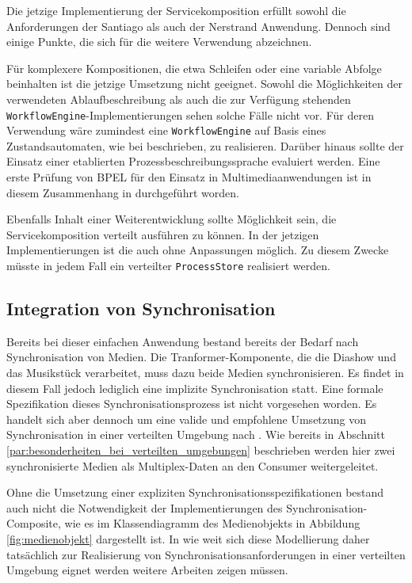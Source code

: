   Die jetzige Implementierung der Servicekomposition erfüllt sowohl die Anforderungen der Santiago als auch der Nerstrand Anwendung. Dennoch sind einige Punkte, die sich für die weitere Verwendung abzeichnen.
  
  Für komplexere Kompositionen, die etwa Schleifen oder eine variable Abfolge beinhalten ist die jetzige Umsetzung nicht geeignet. Sowohl die Möglichkeiten der verwendeten Ablaufbeschreibung als auch die zur Verfügung stehenden \verb!WorkflowEngine!-Implementierungen sehen solche Fälle nicht vor. Für deren Verwendung wäre zumindest eine \verb!WorkflowEngine! auf Basis eines Zustandsautomaten, wie bei \citep{biornstad2006cfs} beschrieben, zu realisieren. Darüber hinaus sollte der Einsatz einer etablierten Prozessbeschreibungssprache evaluiert werden. Eine erste Prüfung von BPEL für den Einsatz in Multimediaanwendungen ist in diesem Zusammenhang in \citep{samma08} durchgeführt worden.

  Ebenfalls Inhalt einer Weiterentwicklung sollte Möglichkeit sein, die Servicekomposition verteilt ausführen zu können. In der jetzigen Implementierungen ist die auch ohne Anpassungen möglich. Zu diesem Zwecke müsste in jedem Fall ein verteilter \verb!ProcessStore! realisiert werden.


\subsection{Integration von Synchronisation} %
\label{sub:integration_von_synchronisation}

  Bereits bei dieser einfachen Anwendung bestand bereits der Bedarf nach Synchronisation von Medien. Die Tranformer-Komponente, die die Diashow und das Musikstück verarbeitet, muss dazu beide Medien synchronisieren. Es findet in diesem Fall jedoch lediglich eine implizite Synchronisation statt. Eine formale Spezifikation dieses Synchronisationsprozess ist nicht vorgesehen worden. Es handelt sich aber dennoch um eine valide und empfohlene Umsetzung von Synchronisation in einer verteilten Umgebung nach \citep[S. 609]{multimedia_technologie}. Wie bereits in Abschnitt \ref{par:besonderheiten_bei_verteilten_umgebungen} beschrieben werden hier zwei synchronisierte Medien als Multiplex-Daten an den Consumer weitergeleitet.
  
  Ohne die Umsetzung einer expliziten Synchronisationsspezifikationen bestand auch nicht die Notwendigkeit der Implementierungen des Synchronisation-Composite, wie es im Klassendiagramm des Medienobjekts in Abbildung \ref{fig:medienobjekt} dargestellt ist. In wie weit sich diese Modellierung daher tatsächlich zur Realisierung von Synchronisationsanforderungen in einer verteilten Umgebung eignet werden weitere Arbeiten zeigen müssen.

